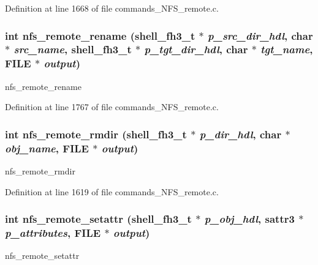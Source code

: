 Definition at line 1668 of file commands\_\-NFS\_\-remote.c.
\subsubsection[{nfs\_\-remote\_\-rename}]{\setlength{\rightskip}{0pt plus 5cm}int nfs\_\-remote\_\-rename ({\bf shell\_\-fh3\_\-t} $\ast$ {\em p\_\-src\_\-dir\_\-hdl}, \/  char $\ast$ {\em src\_\-name}, \/  {\bf shell\_\-fh3\_\-t} $\ast$ {\em p\_\-tgt\_\-dir\_\-hdl}, \/  char $\ast$ {\em tgt\_\-name}, \/  FILE $\ast$ {\em output})}\label{commands__NFS__remote_8c_da2fb373c0c44d26d35898c5b124b413}


nfs\_\-remote\_\-rename 

Definition at line 1767 of file commands\_\-NFS\_\-remote.c.
\subsubsection[{nfs\_\-remote\_\-rmdir}]{\setlength{\rightskip}{0pt plus 5cm}int nfs\_\-remote\_\-rmdir ({\bf shell\_\-fh3\_\-t} $\ast$ {\em p\_\-dir\_\-hdl}, \/  char $\ast$ {\em obj\_\-name}, \/  FILE $\ast$ {\em output})}\label{commands__NFS__remote_8c_b8b37503f4fc0fa700c014b3c600dd2e}


nfs\_\-remote\_\-rmdir 

Definition at line 1619 of file commands\_\-NFS\_\-remote.c.
\subsubsection[{nfs\_\-remote\_\-setattr}]{\setlength{\rightskip}{0pt plus 5cm}int nfs\_\-remote\_\-setattr ({\bf shell\_\-fh3\_\-t} $\ast$ {\em p\_\-obj\_\-hdl}, \/  sattr3 $\ast$ {\em p\_\-attributes}, \/  FILE $\ast$ {\em output})}\label{commands__NFS__remote_8c_3fd856322c5a8ab02a65b61eb1771e5a}


nfs\_\-remote\_\-setattr 

